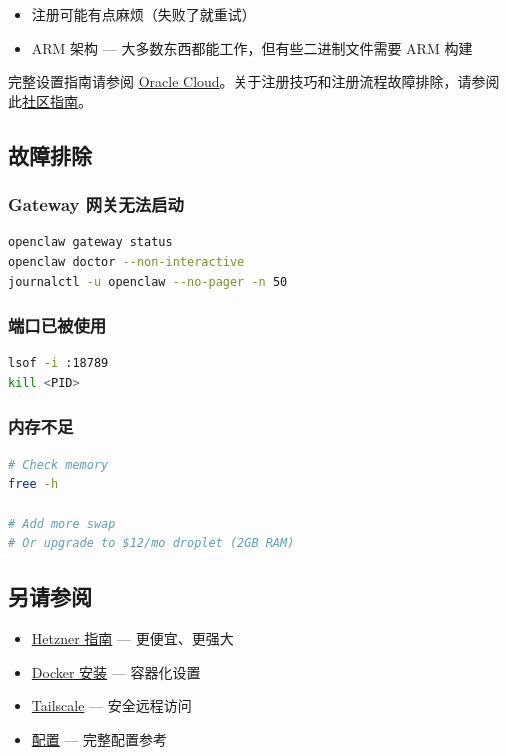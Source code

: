 \begin{itemize}
  \item 注册可能有点麻烦（失败了就重试）
  \item ARM 架构 — 大多数东西都能工作，但有些二进制文件需要 ARM 构建
\end{itemize}


完整设置指南请参阅 \href{/platforms/oracle}{Oracle Cloud}。关于注册技巧和注册流程故障排除，请参阅此\href{https://gist.github.com/rssnyder/51e3cfedd730e7dd5f4a816143b25dbd}{社区指南}。

\hrulefill


\subsection{故障排除}


\subsubsection{Gateway 网关无法启动}


\begin{lstlisting}[language=bash]
openclaw gateway status
openclaw doctor --non-interactive
journalctl -u openclaw --no-pager -n 50
\end{lstlisting}


\subsubsection{端口已被使用}


\begin{lstlisting}[language=bash]
lsof -i :18789
kill <PID>
\end{lstlisting}


\subsubsection{内存不足}


\begin{lstlisting}[language=bash]
# Check memory
free -h

# Add more swap
# Or upgrade to $12/mo droplet (2GB RAM)
\end{lstlisting}


\hrulefill


\subsection{另请参阅}


\begin{itemize}
  \item \href{/install/hetzner}{Hetzner 指南} — 更便宜、更强大
  \item \href{/install/docker}{Docker 安装} — 容器化设置
  \item \href{/gateway/tailscale}{Tailscale} — 安全远程访问
  \item \href{/gateway/configuration}{配置} — 完整配置参考
\end{itemize}



